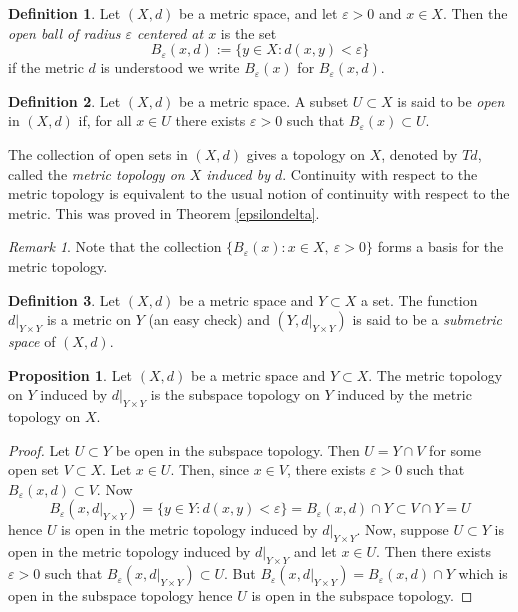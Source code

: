 \documentclass{book}
\theoremstyle{definition}
\newtheorem{proposition}{Proposition}[section]
\newtheorem{definition}{Definition}[section]
\theoremstyle{remark}
\newtheorem{remark}{Remark}[section]
\begin{document}
\begin{definition}
Let $(X,d)$ be a metric space, and let $\varepsilon>0$ and $x\in X$. Then the \textit{open ball of radius $\varepsilon$ centered at $x$} is the set
$$B_\varepsilon(x,d):=\{y\in X:d(x,y)<\varepsilon\}$$
if the metric $d$ is understood we write $B_\varepsilon(x)$ for $B_\varepsilon(x,d)$.
\end{definition}

\begin{definition}
Let $(X,d)$ be a metric space. A subset $U\subset X$ is said to be \textit{open} in $(X,d)$ if, for all $x\in U$ there exists $\varepsilon>0$ such that $B_\varepsilon(x)\subset U$.
\end{definition}

The collection of open sets in $(X,d)$ gives a topology on $X$, denoted by $Td$, called the \textit{metric topology on $X$ induced by $d$}. Continuity with respect to the metric topology is equivalent to the usual notion of continuity with respect to the metric. This was proved in Theorem \ref{epsilondelta}.

\begin{remark}
Note that the collection $\{B_\varepsilon(x):x\in X,\:\varepsilon>0\}$ forms a basis for the metric topology.
\end{remark}

\begin{definition}
Let $(X,d)$ be a metric space and $Y\subset X$ a set. The function $d|_{Y\times Y}$ is a metric on $Y$ (an easy check) and $(Y,d|_{Y\times Y})$ is said to be a \textit{submetric space} of $(X,d)$.
\end{definition}

\begin{proposition}
Let $(X,d)$ be a metric space and $Y\subset X$. The metric topology on $Y$ induced by $d|_{Y\times Y}$ is the subspace topology on $Y$ induced by the metric topology on $X$.
\end{proposition}
\begin{proof}
Let $U\subset Y$ be open in the subspace topology. Then $U=Y\cap V$ for some open set $V\subset X$. Let $x\in U$. Then, since $x\in V$, there exists $\varepsilon>0$ such that $B_\varepsilon(x,d)\subset V$. Now
$$B_\varepsilon(x,d|_{Y\times Y})=\{y\in Y:d(x,y)<\varepsilon\}=B_\varepsilon(x,d)\cap Y\subset V\cap Y=U$$
hence $U$ is open in the metric topology induced by $d|_{Y\times Y}$. Now, suppose $U\subset Y$ is open in the metric topology induced by $d|_{Y\times Y}$ and let $x\in U$. Then there exists $\varepsilon>0$ such that $B_\varepsilon(x,d|_{Y\times Y})\subset U$. But $B_\varepsilon(x,d|_{Y\times Y})=B_\varepsilon(x,d)\cap Y$ which is open in the subspace topology hence $U$ is open in the subspace topology.
\end{proof}
\end{document}
